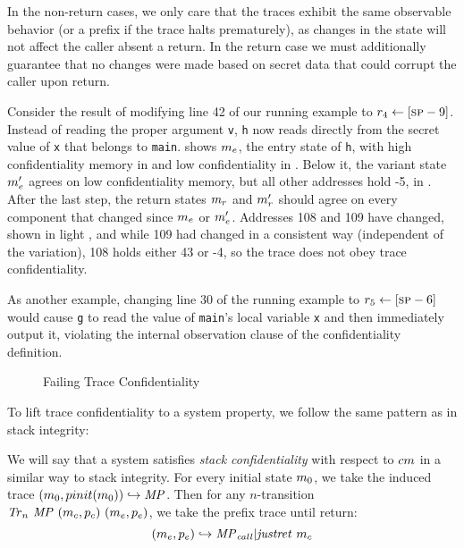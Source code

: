 \documentclass[acmsmall,review,anonymous]{acmart}\settopmatter{printfolios=true,printccs=false,printacmref=false}
\begin{document}
In the non-return cases, we only care that the traces exhibit the same
observable behavior (or a prefix if the trace halts prematurely), as changes
in the state will not affect the caller absent a return.  In the return case
we must additionally guarantee that no changes were made based on secret data
that could corrupt the caller upon return.

Consider the result of modifying line 42 of our running example to $r_4 \leftarrow [\textsc{sp} - 9]$.
Instead of reading the proper argument {\tt v}, {\tt h} now reads directly from the
secret value of {\tt x} that belongs to {\tt main}. 
shows \(m_e\), the entry state of {\tt h}, with high confidentiality memory
in {\high} and low confidentiality in {\low}. Below it, the variant state
\(m_e'\) agrees on low confidentiality memory, but all other addresses
hold -5, in {\varied}.  After the last step, the return states \(m_r\) and
\(m_r'\) should agree on every component that changed since \(m_e\) or
\(m_e'\). Addresses 108 and 109 have changed, shown in light {\low}, and while 109
had changed in a consistent way (independent of the variation), 108 holds either 43 or -4, so the trace does not obey trace confidentiality.

As another example,
changing line 30 of the running example to $r_5  \leftarrow [\textsc{sp} - 6]$ would cause
{\tt g} to read the value of {\tt main}'s local variable {\tt x} and then immediately
output it, violating the internal observation clause of the confidentiality definition.

\begin{figure}
  \confidentialityendexample
  \caption{Failing Trace Confidentiality}
  \label{fig:confex}
\end{figure}


To lift trace confidentiality to a system property, we follow the same
pattern as in stack integrity:

We will say that a system satisfies {\em stack confidentiality} with respect to
\(cm\) in a similar way to stack integrity. For every initial state
\(m_0\), we take the induced trace \((m_0,pinit(m_0))
\hookrightarrow \mathit{MP}\). Then for any \(n\)-transition
\(\mathit{Tr}_n ~ \mathit{MP} ~ (m_c,p_c) ~
(m_e,p_e)\), we take the prefix trace until return:
%
\[(m_e,p_e) \hookrightarrow \mathit{MP}_{\mathit{call}} | \mathit{justret}\ m_c\]
\end{document}
